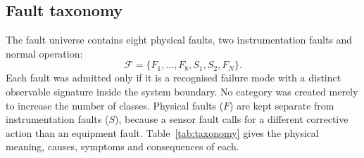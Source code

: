 \subsection{Fault taxonomy}

The fault universe contains eight physical faults, two instrumentation faults and normal operation:
\begin{equation}
  \mathcal{F} = \{F_1, \dots, F_8, S_1, S_2, F_N\}.
\end{equation}
Each fault was admitted only if it is a recognised failure mode with a distinct observable signature inside the system boundary. No category was created merely to increase the number of classes. Physical faults ($F$) are kept separate from instrumentation faults ($S$), because a sensor fault calls for a different corrective action than an equipment fault. Table~\ref{tab:taxonomy} gives the physical meaning, causes, symptoms and consequences of each.

